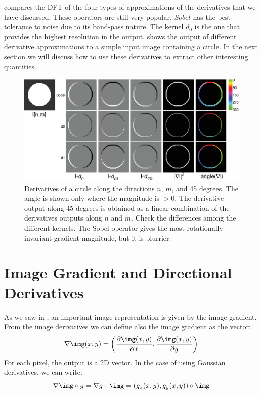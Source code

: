 \Fig{\ref{fig:DFTderivativeoperators}} compares the DFT of the four types of approximations of the derivatives that we have discussed. These operators are still very popular. $Sobel$ has the best tolerance to noise due to its band-pass nature. The kernel $d_0$ is the one that provides the highest resolution in the output. \Fig{\ref{fig:circle}} shows the output of different derivative approximations to a simple input image containing a circle. In the next section we will discuss how to use these derivatives to extract other interesting quantities.


\begin{figure}[t]
\centerline{
\includegraphics[width=1\linewidth]{figures/spatial_filters/circle.eps}}
\caption{Derivatives of a circle along the directions $n$, $m$, and 45 degrees. 
The angle is shown only where the magnitude is $>0$. The derivative output along 45 degrees is obtained as a linear combination of the derivatives outputs along $n$ and $m$. Check the differences among the different kernels. The Sobel operator gives the most rotationally invariant gradient magnitude, but it is blurrier.
} 
\label{fig:circle}
\end{figure}

\section{Image Gradient and Directional Derivatives}

As we saw in \chap{\ref{chapter:simplesystem}}, an important image representation is given by the image gradient. From the image derivatives we can define also the image gradient as the vector:
\begin{equation}
\nabla \img (x,y) = \left( \frac{\partial \img(x,y)}{\partial x}, \frac{\partial \img(x,y)}{\partial y} \right)
\end{equation}
For each pixel, the output is a 2D vector.  In the case of using Gaussian derivatives, we can write:
\begin{equation}
\nabla \img \circ g = \nabla g \circ \img = \left( g_x(x,y), g_y(x,y) \right) \circ \img 
\end{equation}


